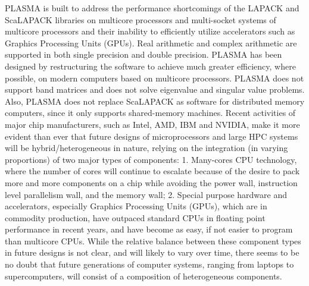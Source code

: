 \begin{enumerate}
PLASMA is built to address the performance shortcomings of the
LAPACK and ScaLAPACK libraries on multicore processors and
multi-socket systems of multicore processors and their inability
to efficiently utilize accelerators such as Graphics Processing
Units (GPUs). Real arithmetic and complex arithmetic are supported
in both single precision and double precision.  PLASMA has been
designed by restructuring the software to achieve much greater
efficiency, where possible, on modern computers based on multicore
processors. PLASMA does not support band matrices and does not
solve eigenvalue and singular value problems. Also, PLASMA does
not replace ScaLAPACK as software for distributed memory
computers, since it only supports shared-memory
machines. \label{\detokenize{i524/technologies:id80}}{\hyperref[\detokenize{i524/technologies:paper-plasma-magma-1}]{\sphinxcrossref{{[}71{]}}}} \label{\detokenize{i524/technologies:id81}}{\hyperref[\detokenize{i524/technologies:www-plasma-1}]{\sphinxcrossref{{[}72{]}}}} Recent
activities of major chip manufacturers, such as Intel, AMD, IBM
and NVIDIA, make it more evident than ever that future designs of
microprocessors and large HPC systems will be hybrid/heterogeneous
in nature, relying on the integration (in varying proportions) of
two major types of components: \label{\detokenize{i524/technologies:id82}}{\hyperref[\detokenize{i524/technologies:paper-plasma-magma-2}]{\sphinxcrossref{{[}73{]}}}}
\label{\detokenize{i524/technologies:id83}}{\hyperref[\detokenize{i524/technologies:paper-plasma-magma-3}]{\sphinxcrossref{{[}74{]}}}}
1. Many-cores CPU technology, where the number of cores will
continue to escalate because of the desire to pack more and more
components on a chip while avoiding the power wall, instruction
level parallelism wall, and the memory wall;
2. Special purpose hardware and accelerators, especially Graphics
Processing Units (GPUs), which are in commodity production, have
outpaced standard CPUs in floating point performance in recent
years, and have become as easy, if not easier to program than
multicore CPUs.  While the relative balance between these
component types in future designs is not clear, and will likely to
vary over time, there seems to be no doubt that future generations
of computer systems, ranging from laptops to supercomputers, will
consist of a composition of heterogeneous components.
\label{\detokenize{i524/technologies:id84}}{\hyperref[\detokenize{i524/technologies:paper-plasma-magma-4}]{\sphinxcrossref{{[}75{]}}}}\label{\detokenize{i524/technologies:id85}}{\hyperref[\detokenize{i524/technologies:paper-plasma-magma-5}]{\sphinxcrossref{{[}76{]}}}}\label{\detokenize{i524/technologies:id86}}{\hyperref[\detokenize{i524/technologies:paper-plasma-magma-6}]{\sphinxcrossref{{[}77{]}}}}


\end{enumerate}
